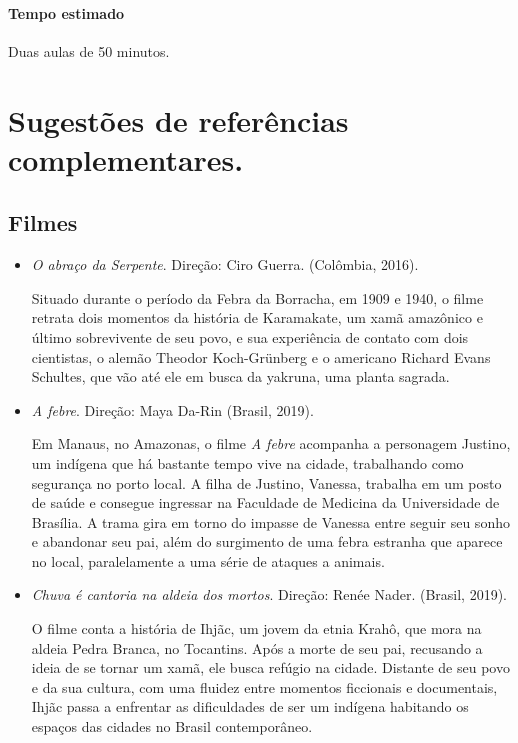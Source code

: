 \documentclass[11pt]{extarticle}
\begin{document}
\paragraph{Tempo estimado} Duas aulas de 50 minutos.

\section{Sugestões de referências complementares.}

\subsection{Filmes}

\begin{itemize}

\item \textit{O abraço da Serpente}. Direção: Ciro Guerra. (Colômbia, 2016).

Situado durante o período da Febra da Borracha, em 1909 e 1940, o filme retrata dois momentos da história de Karamakate, um xamã amazônico e último sobrevivente de seu povo, e sua experiência de contato com dois cientistas, o alemão Theodor Koch-Grünberg e o americano Richard Evans Schultes, que vão até ele em busca da yakruna, uma planta sagrada. 

\item \textit{A febre}. Direção: Maya Da-Rin (Brasil, 2019).

Em Manaus, no Amazonas, o filme \emph{A febre} acompanha a personagem Justino, um indígena que há bastante tempo vive na cidade, trabalhando como segurança no porto local. A filha de Justino, Vanessa, trabalha em um posto de saúde e consegue ingressar na Faculdade de Medicina da Universidade de Brasília. A trama gira em torno do impasse de Vanessa entre seguir seu sonho e abandonar seu pai, além do surgimento de uma febra estranha que aparece no local, paralelamente a uma série de ataques a animais.

\item \textit{Chuva é cantoria na aldeia dos mortos}. Direção: Renée Nader. (Brasil, 2019).

O filme conta a história de Ihjãc, um jovem da etnia Krahô, que mora na aldeia Pedra Branca, no Tocantins. Após a morte de seu pai, recusando a ideia de se tornar um xamã, ele busca refúgio na cidade. Distante de seu povo e da sua cultura, com uma fluidez 
entre momentos ficcionais e documentais, Ihjãc passa a enfrentar as dificuldades de ser um indígena habitando os espaços das cidades no Brasil contemporâneo.


\end{itemize}
\end{document}
